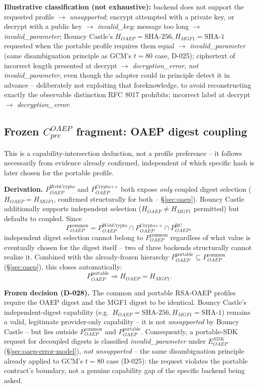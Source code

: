 \documentclass[11pt,a4paper]{article}
\begin{document}
\textbf{Illustrative classification (not exhaustive):} backend does not support the requested profile $\to$ \emph{unsupported}; encrypt attempted with a private key, or decrypt with a public key $\to$ \emph{invalid\_key}; message too long $\to$ \emph{invalid\_parameter}; Bouncy Castle's $H_{OAEP}=\text{SHA-256}, H_{MGF1}=\text{SHA-1}$ requested when the portable profile requires them equal $\to$ \emph{invalid\_parameter} (same disambiguation principle as GCM's $t=80$ case, D-025); ciphertext of incorrect length presented at decrypt $\to$ \emph{decryption\_error}, \emph{not} \emph{invalid\_parameter}, even though the adapter could in principle detect it in advance -- deliberately not exploiting that foreknowledge, to avoid reconstructing exactly the observable distinction RFC 8017 prohibits; incorrect label at decrypt $\to$ \emph{decryption\_error}.

\subsection{Frozen $C_{pre}^{OAEP}$ fragment: OAEP digest coupling}\label{sec:oaep-digest-coupling}
This is a capability-intersection deduction, not a profile preference -- it follows necessarily from evidence already confirmed, independent of which specific hash is later chosen for the portable profile.

\textbf{Derivation.} $P_{OAEP}^{\text{WebCrypto}}$ and $P_{OAEP}^{\text{Crypto++}}$ both expose \emph{only} coupled digest selection ($H_{OAEP}=H_{MGF1}$, confirmed structurally for both -- \S\ref{sec:oaep}). Bouncy Castle additionally supports independent selection ($H_{OAEP} \neq H_{MGF1}$ permitted) but defaults to coupled. Since
\[P_{OAEP}^{\text{common}} = P_{OAEP}^{\text{WebCrypto}} \cap P_{OAEP}^{\text{Crypto++}} \cap P_{OAEP}^{\text{BC}},\]
independent digest selection cannot belong to $P_{OAEP}^{\text{common}}$ regardless of what value is eventually chosen for the digest itself -- two of three backends structurally cannot realize it. Combined with the already-frozen hierarchy $P_{OAEP}^{\text{portable}} \subseteq P_{OAEP}^{\text{common}}$ (\S\ref{sec:oaep}), this closes automatically:
\[P_{OAEP}^{\text{portable}} \Rightarrow H_{OAEP} = H_{MGF1}.\]

\textbf{Frozen decision (D-028).} The common and portable RSA-OAEP profiles require the OAEP digest and the MGF1 digest to be identical. Bouncy Castle's independent-digest capability (e.g.\ $H_{OAEP}=\text{SHA-256}, H_{MGF1}=\text{SHA-1}$) remains a valid, legitimate provider-only capability -- it is not \emph{unsupported} by Bouncy Castle -- but lies outside $P_{OAEP}^{\text{common}}$ and $P_{OAEP}^{\text{portable}}$. Consequently, a portable-SDK request for decoupled digests is classified \emph{invalid\_parameter} under $E_{OAEP}^{SDK}$ (\S\ref{sec:oaep-error-model}), \emph{not} \emph{unsupported} -- the same disambiguation principle already applied to GCM's $t=80$ case (D-025): the request violates the portable contract's boundary, not a genuine capability gap of the specific backend being asked.
\end{document}
